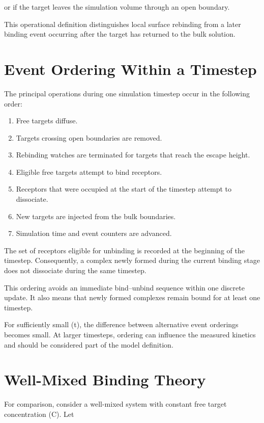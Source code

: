 \documentclass[11pt]{article}
\begin{document}
or if the target leaves the simulation volume through an open boundary.

This operational definition distinguishes local surface rebinding from a later binding event occurring after the target has returned to the bulk solution.

\section{Event Ordering Within a Timestep}

The principal operations during one simulation timestep occur in the following order:

\begin{enumerate}
\item Free targets diffuse.
\item Targets crossing open boundaries are removed.
\item Rebinding watches are terminated for targets that reach the escape height.
\item Eligible free targets attempt to bind receptors.
\item Receptors that were occupied at the start of the timestep attempt to dissociate.
\item New targets are injected from the bulk boundaries.
\item Simulation time and event counters are advanced.
\end{enumerate}

The set of receptors eligible for unbinding is recorded at the beginning of the timestep. Consequently, a complex newly formed during the current binding stage does not dissociate during the same timestep.

This ordering avoids an immediate bind--unbind sequence within one discrete update. It also means that newly formed complexes remain bound for at least one timestep.

For sufficiently small (\Delta t), the difference between alternative event orderings becomes small. At larger timesteps, ordering can influence the measured kinetics and should be considered part of the model definition.

\section{Well-Mixed Binding Theory}

For comparison, consider a well-mixed system with constant free target concentration (C). Let
\end{document}

